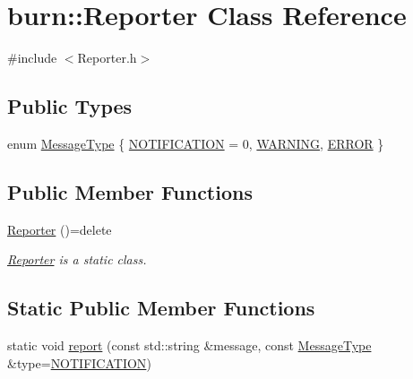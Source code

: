 \hypertarget{classburn_1_1_reporter}{\section{burn\-:\-:Reporter Class Reference}
\label{classburn_1_1_reporter}
}


{\ttfamily \#include $<$Reporter.\-h$>$}

\subsection*{Public Types}
\begin{DoxyCompactItemize}
\item 
enum \hyperlink{classburn_1_1_reporter_a854e2c1c171ee6de2235efb5d7e8a3c7}{Message\-Type} \{ \hyperlink{classburn_1_1_reporter_a854e2c1c171ee6de2235efb5d7e8a3c7ab81a578256e642de89288137305fc594}{N\-O\-T\-I\-F\-I\-C\-A\-T\-I\-O\-N} = 0, 
\hyperlink{classburn_1_1_reporter_a854e2c1c171ee6de2235efb5d7e8a3c7afe916dc9c0a7ff642a4c0b7dee098ee6}{W\-A\-R\-N\-I\-N\-G}, 
\hyperlink{classburn_1_1_reporter_a854e2c1c171ee6de2235efb5d7e8a3c7a5cd98b46038b6310aeb15c06c9e9b7ac}{E\-R\-R\-O\-R}
 \}
\end{DoxyCompactItemize}
\subsection*{Public Member Functions}
\begin{DoxyCompactItemize}
\item 
\hyperlink{classburn_1_1_reporter_a4845e294015558d7965121455d7be5a8}{Reporter} ()=delete
\begin{DoxyCompactList}\small\item\em \hyperlink{classburn_1_1_reporter}{Reporter} is a static class. \end{DoxyCompactList}\end{DoxyCompactItemize}
\subsection*{Static Public Member Functions}
\begin{DoxyCompactItemize}
\item 
static void \hyperlink{classburn_1_1_reporter_aed47a1d0dd9cfd4bf6706a9e470e338d}{report} (const std\-::string \&message, const \hyperlink{classburn_1_1_reporter_a854e2c1c171ee6de2235efb5d7e8a3c7}{Message\-Type} \&type=\hyperlink{classburn_1_1_reporter_a854e2c1c171ee6de2235efb5d7e8a3c7ab81a578256e642de89288137305fc594}{N\-O\-T\-I\-F\-I\-C\-A\-T\-I\-O\-N})
\end{DoxyCompactItemize}


